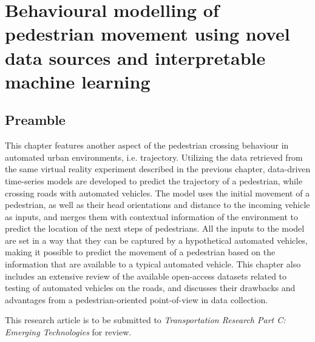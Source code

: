 \chapter{Behavioural modelling of pedestrian movement using novel data sources and interpretable machine learning}
\label{chap6}
\thispagestyle{empty}
\pagebreak

\section*{Preamble}
This chapter features another aspect of the pedestrian crossing behaviour in automated urban environments, i.e. trajectory. Utilizing the data retrieved from the same virtual reality experiment described in the previous chapter, data-driven time-series models are developed to predict the trajectory of a pedestrian, while crossing roads with automated vehicles. The model uses the initial movement of a pedestrian, as well as their head orientations and distance to the incoming vehicle as inputs, and merges them with contextual information of the environment to predict the location of the next steps of pedestrians. All the inputs to the model are set in a way that they can be captured by a hypothetical automated vehicles, making it possible to predict the movement of a pedestrian based on the information that are available to a typical automated vehicle. This chapter also includes an extensive review of the available open-access datasets related to testing of automated vehicles on the roads, and discusses their drawbacks and advantages from a pedestrian-oriented point-of-view in data collection.

\vspace{1em}
\noindent
This research article is to be submitted to \textit{Transportation Research Part C: Emerging Technologies} for review.
\clearpage

